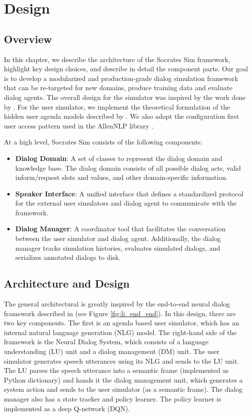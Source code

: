 \chapter{Design}
\label{chap:design}

\section{Overview}
\label{sec:designintroduction}

In this chapter, we describe the architecture of the Socrates Sim framework, highlight key design choices, and describe in detail the component parts. Our goal is to develop a modularized and production-grade dialog simulation framework that can be re-targeted for new domains, produce training data and evaluate dialog agents. The overall design for the simulator was inspired by the work done by \cite{li_usersim}. For the user simulator, we implement the theoretical formulation of the hidden user agenda models described by \cite{Schatzmann2009TheHA}. We also adopt the configuration first user access pattern used in the AllenNLP library \cite{Gardner_allennlp}.

At a high level, Socrates Sim consists of the following components:
\begin{itemize}
	\item \textbf{Dialog Domain}: A set of classes to represent the dialog domain and knowledge base. The dialog domain consists of all possible dialog acts, valid inform/request slots and values, and other domain-specific information. 
	\item \textbf{Speaker Interface}: A unified interface that defines a standardized protocol for the external user simulators and dialog agent to communicate with the framework. 
	\item \textbf{Dialog Manager}: A coordinator tool that facilitates the conversation between the user simulator and dialog agent. Additionally, the dialog manager tracks simulation histories, evaluates simulated dialogs, and serializes annotated dialogs to disk.  
\end{itemize}


\section{Architecture and Design} 

The general architectural is greatly inspired by the end-to-end neural dialog framework described in \cite{li_end_to_end}  (see Figure \ref{fig:li_end_end}). In this design, there are two key components. The first is an agenda based user simulator, which has an internal natural language generation (NLG) model. The right-hand side of the framework is the Neural Dialog System, which consists of a language understanding (LU) unit and a dialog management (DM) unit. The user simulator generates speech utterances using its NLG and sends to the LU unit. The LU parses the speech utterance into a semantic frame (implemented as Python dictionary) and hands it the dialog management unit, which generates a system action and sends to the user simulator (as a semantic frame). The dialog manager also has a state tracker and policy learner. The policy learner is implemented as a deep Q-network (DQN). 

